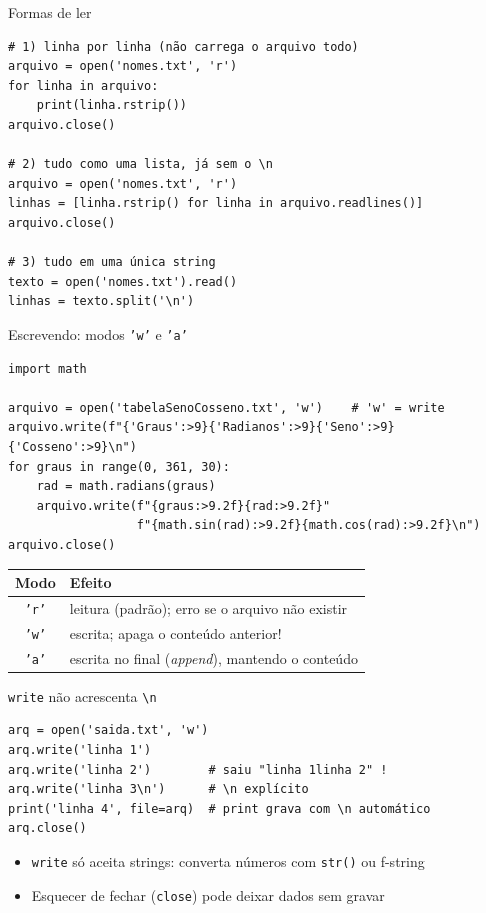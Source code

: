 \documentclass[aspectratio=169,10pt,t]{beamer}
\begin{document}
\begin{frame}[fragile]{Formas de ler}
\begin{lstlisting}
# 1) linha por linha (não carrega o arquivo todo)
arquivo = open('nomes.txt', 'r')
for linha in arquivo:
    print(linha.rstrip())
arquivo.close()

# 2) tudo como uma lista, já sem o \n
arquivo = open('nomes.txt', 'r')
linhas = [linha.rstrip() for linha in arquivo.readlines()]
arquivo.close()

# 3) tudo em uma única string
texto = open('nomes.txt').read()
linhas = texto.split('\n')
\end{lstlisting}
\end{frame}

\begin{frame}[fragile]{Escrevendo: modos \texttt{'w'} e \texttt{'a'}}
\begin{lstlisting}[basicstyle=\ttfamily\scriptsize]
import math

arquivo = open('tabelaSenoCosseno.txt', 'w')    # 'w' = write
arquivo.write(f"{'Graus':>9}{'Radianos':>9}{'Seno':>9}{'Cosseno':>9}\n")
for graus in range(0, 361, 30):
    rad = math.radians(graus)
    arquivo.write(f"{graus:>9.2f}{rad:>9.2f}"
                  f"{math.sin(rad):>9.2f}{math.cos(rad):>9.2f}\n")
arquivo.close()
\end{lstlisting}
  \begin{center}\small
  \begin{tabular}{cl}
    \toprule
    Modo & Efeito\\
    \midrule
    \texttt{'r'} & leitura (padrão); erro se o arquivo não existir\\
    \texttt{'w'} & escrita; \alert{apaga} o conteúdo anterior!\\
    \texttt{'a'} & escrita no final (\emph{append}), mantendo o conteúdo\\
    \bottomrule
  \end{tabular}
  \end{center}
\end{frame}

\begin{frame}[fragile]{\texttt{write} não acrescenta \texttt{\textbackslash n}}
\begin{lstlisting}
arq = open('saida.txt', 'w')
arq.write('linha 1')
arq.write('linha 2')        # saiu "linha 1linha 2" !
arq.write('linha 3\n')      # \n explícito
print('linha 4', file=arq)  # print grava com \n automático
arq.close()
\end{lstlisting}
  \begin{itemize}
    \item \texttt{write} só aceita \alert{strings}: converta números com \texttt{str()} ou f-string
    \item Esquecer de fechar (\texttt{close}) pode deixar dados sem gravar
  \end{itemize}
\end{frame}
\end{document}
